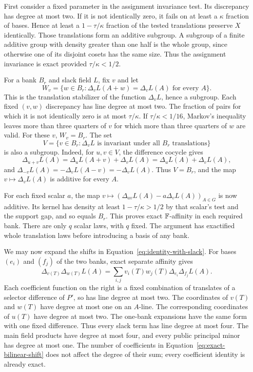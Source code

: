 First consider a fixed parameter in the assignment invariance test.
Its discrepancy has degree at most two. If it is not identically
zero, it fails on at least a $\kappa$ fraction of bases. Hence at
least a $1-\tau/\kappa$ fraction of the tested translations preserve
$X$ identically. Those translations form an additive subgroup.
A subgroup of a finite additive group with density greater than
one half is the whole group, since otherwise one of its disjoint
cosets has the same size. Thus the assignment invariance is exact
provided $\tau/\kappa<1/2$.

For a bank $B_r$ and slack field $L$, fix $v$ and let
\[
 W_v=\{w\in B_r:
       \Delta_vL(A+w)=\Delta_vL(A)\text{ for every }A\}.
\]
This is the translation stabilizer of the function $\Delta_vL$,
hence a subgroup. Each fixed $(v,w)$ discrepancy has line degree
at most two. The fraction of pairs for which it is not identically
zero is at most $\tau/\kappa$. If $\tau/\kappa<1/16$, Markov's
inequality leaves more than three quarters of $v$ for which more
than three quarters of $w$ are valid. For these $v$, $W_v=B_r$.
The set
\[
 V=\{v\in B_r:\Delta_vL\text{ is invariant under all }B_r
                    \text{ translations}\}
\]
is also a subgroup. Indeed, for $u,v\in V$, the difference cocycle
gives
\[
 \Delta_{u+v}L(A)
 =\Delta_uL(A+v)+\Delta_vL(A)
 =\Delta_uL(A)+\Delta_vL(A),
\]
and $\Delta_{-v}L(A)=-\Delta_vL(A-v)=-\Delta_vL(A)$.
Thus $V=B_r$, and the map $v\mapsto\Delta_vL(A)$ is additive for
every $A$.

For each fixed scalar $a$, the map
$v\mapsto(\Delta_{av}L(A)-a\Delta_vL(A))_{A\in G}$ is now additive.
Its kernel has density at least $1-\tau/\kappa>1/2$ by that scalar's
test and the support gap, and so equals $B_r$. This proves exact
$\mathbb F$-affinity in each required bank. There are only $q$ scalar laws,
with $q$ fixed. The argument has exactified whole translation laws
before introducing a basis of any bank.

We may now expand the shifts in
Equation~\ref{eq:identity-with-slack}. For bases $(e_i)$ and $(f_j)$
of the two banks, exact separate affinity gives
\begin{equation}\label{eq:exact-bilinear-shift}
 \Delta_{v(T)}\Delta_{w(T)}L(A)
 =\sum_{i,j}v_i(T)w_j(T)\Delta_{e_i}\Delta_{f_j}L(A).
\end{equation}
Each coefficient function on the right is a fixed combination of
translates of a selector difference of $P'$, so has line degree at
most two. The coordinates of $v(T)$ and $w(T)$ have degree at most
one on an $A$-line. The corresponding coordinates of $u(T)$ have
degree at most two. The one-bank expansions have the same form
with one fixed difference. Thus every slack term has line degree
at most four. The main field products have degree at most four,
and every public principal minor has degree at most one.
The number of coefficients in Equation~\ref{eq:exact-bilinear-shift}
does not affect the degree of their sum; every coefficient identity
is already exact.

